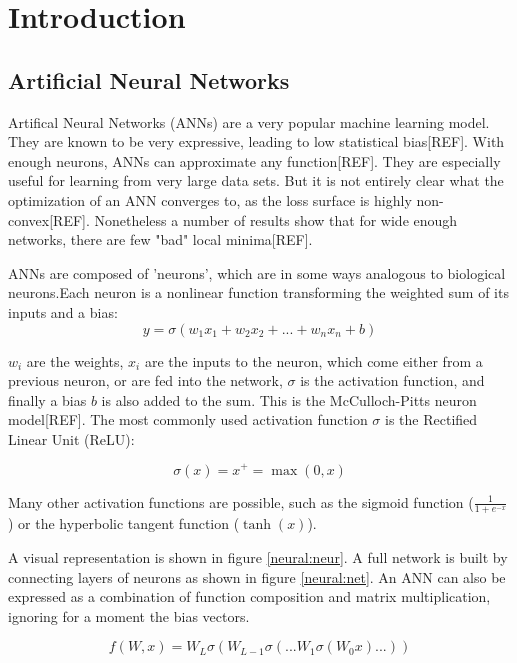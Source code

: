 \chapter{Introduction}
\section{Artificial Neural Networks}

Artifical Neural Networks (ANNs) are a very popular machine learning model. They are known to be very expressive, leading to low statistical bias[REF]. With enough neurons, ANNs can approximate any function[REF].  They are especially useful for learning from very large data sets. But it is not entirely clear what the optimization of an ANN converges to, as the loss surface is highly non-convex[REF]. Nonetheless a number of results show that for wide enough networks, there are few "bad" local minima[REF].

ANNs are composed of 'neurons', which are in some ways analogous to biological neurons.Each neuron is a nonlinear function transforming the weighted sum of its inputs and a bias:
\begin{equation}
      y = \sigma(w_1x_1+w_2x_2+...+w_nx_n + b)
\end{equation}

$w_i$ are the weights, $x_i$ are the inputs to the neuron, which come either from a previous neuron, or are fed into the network, $\sigma$ is the activation function, and finally a bias $b$ is also added to the sum. This is the McCulloch-Pitts neuron model[REF]. The most commonly used activation function $\sigma$ is the Rectified Linear Unit (ReLU):

\begin{equation}
      \sigma(x) = x^+ = \max(0,x)
\end{equation}

Many other activation functions are possible, such as the sigmoid function ($\frac{1}{1+e^{-x}}$) or the hyperbolic tangent function ($\tanh(x)$).

A visual representation is shown in figure \ref{neural:neur}. A full network is built by connecting layers of neurons as shown in figure \ref{neural:net}. An ANN can also be expressed as a combination of function composition and matrix multiplication, ignoring for a moment the bias vectors.

\begin{equation}
         f(W,x) = W_L\sigma(W_{L-1}\sigma(...W_1\sigma(W_0x)...))
         \label{nnfnc}
\end{equation}

